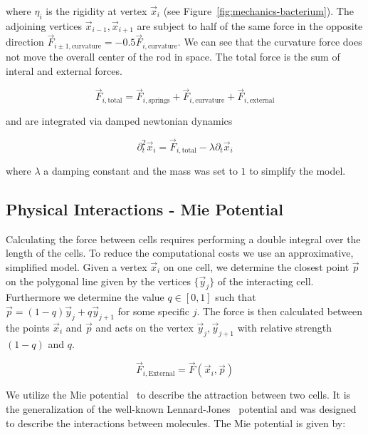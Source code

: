 \documentclass[10pt,letterpaper]{article}
\begin{document}
where $\eta_i$ is the rigidity at vertex $\vec{x}_i$ (see Figure~\ref{fig:mechanics-bacterium}).
The adjoining vertices $\vec{x}_{i-1},\vec{x}_{i+1}$ are subject to half of the same force in the
opposite direction $\vec{F}_{i\pm 1,\text{curvature}} = -0.5\vec{F}_{i,\text{curvature}}$.
We can see that the curvature force does not move the overall center of the rod in space.
The total force is the sum of interal and external forces.

\begin{equation}
    \vec{F}_{i,\text{total}} = \vec{F}_{i,\text{springs}}+ \vec{F}_{i,\text{curvature}}
        + \vec{F}_{i,\text{external}}
\end{equation}

and are integrated via damped newtonian dynamics

\begin{equation}
    \partial_t^2 \vec{x}_i = \vec{F}_{i,\text{total}} - \lambda \partial_t\vec{x}_i
\end{equation}

where $\lambda$ a damping constant and the mass was set to $1$ to simplify the model.

\subsection{Physical Interactions - Mie Potential}

Calculating the force between cells requires performing a double integral over the length of the
cells.
To reduce the computational costs we use an approximative, simplified model.
Given a vertex $\vec{x}_i$ on one cell, we determine the closest point $\vec{p}$ on the polygonal
line given by the vertices $\{\vec{y}_j\}$ of the interacting cell.
Furthermore we determine the value $q\in[0,1]$ such that $\vec{p} = (1-q)\vec{y}_j + q\vec{y}_{j+1}$
for some specific $j$.
The force is then calculated between the points $\vec{x}_i$ and $\vec{p}$ and acts on
the vertex $\vec{y}_j,\vec{y}_{j+1}$ with relative strength $(1-q)$ and $q$.

\begin{equation}
    \vec{F}_{i,\text{External}} = \vec{F}(\vec{x}_i,\vec{p})
\end{equation}

We utilize the Mie potential~\cite{Mie1903} to describe the attraction between two cells.
It is the generalization of the well-known Lennard-Jones~\cite{Jones1924} potential and was designed
to describe the interactions between molecules.
The Mie potential is given by:
\end{document}
